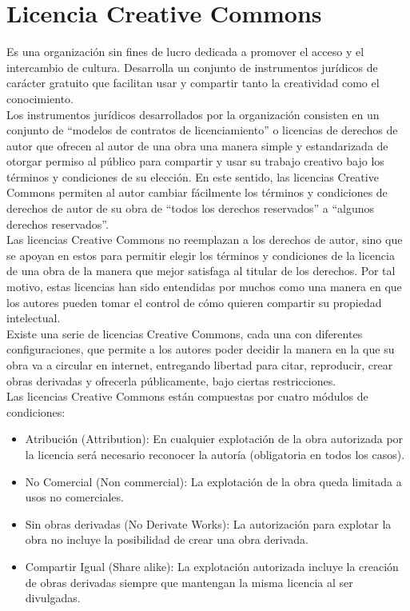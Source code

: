 \section{Licencia Creative Commons}
Es una organización sin fines de lucro dedicada a promover el acceso y el intercambio de cultura. Desarrolla un conjunto de instrumentos jurídicos de carácter gratuito que facilitan usar y compartir tanto la creatividad como el conocimiento.\\
Los instrumentos jurídicos desarrollados por la organización consisten en un conjunto de “modelos de contratos de licenciamiento” o licencias de derechos de autor que ofrecen al autor de una obra una manera simple y estandarizada de otorgar permiso al público para compartir y usar su trabajo creativo bajo los términos y condiciones de su elección. En este sentido, las licencias Creative Commons permiten al autor cambiar fácilmente los términos y condiciones de derechos de autor de su obra de “todos los derechos reservados” a “algunos derechos reservados”.\\
Las licencias Creative Commons no reemplazan a los derechos de autor, sino que se apoyan en estos para permitir elegir los términos y condiciones de la licencia de una obra de la manera que mejor satisfaga al titular de los derechos. Por tal motivo, estas licencias han sido entendidas por muchos como una manera en que los autores pueden tomar el control de cómo quieren compartir su propiedad intelectual.\\
Existe una serie de licencias Creative Commons, cada una con diferentes configuraciones, que permite a los autores poder decidir la manera en la que su obra va a circular en internet, entregando libertad para citar, reproducir, crear obras derivadas y ofrecerla públicamente, bajo ciertas restricciones.\\

Las licencias Creative Commons están compuestas por cuatro módulos de condiciones:
\begin{itemize}
\item Atribución (Attribution): En cualquier explotación de la obra autorizada por la licencia será necesario reconocer la autoría (obligatoria en todos los casos).
\item No Comercial (Non commercial): La explotación de la obra queda limitada a usos no comerciales.
\item Sin obras derivadas (No Derivate Works): La autorización para explotar la obra no incluye la posibilidad de crear una obra derivada.
\item Compartir Igual (Share alike): La explotación autorizada incluye la creación de obras derivadas siempre que mantengan la misma licencia al ser divulgadas.
\end{itemize}

